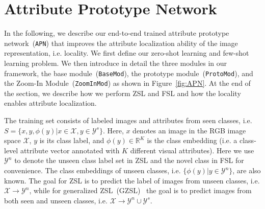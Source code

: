  

\section{Attribute Prototype Network}
In the following, we describe our end-to-end trained attribute prototype network~(\texttt{APN}) that improves the attribute localization ability of the image representation, i.e. locality. We first define our zero-shot learning and few-shot learning problem. We then introduce in detail the three modules in our framework, the base module~(\texttt{BaseMod}), the prototype module~(\texttt{ProtoMod}), and the Zoom-In Module~(\texttt{ZoomInMod}) as shown in Figure~\ref{fig:APN}. 
At the end of the section, we describe how we perform ZSL and FSL 
and how the locality enables attribute localization.

The training set consists of labeled images and attributes from seen classes, i.e. $S=\{x, y, \phi(y)| x \in \mathcal{X}, y \in \mathcal{Y}^s \}$.  Here, $x$ denotes an image in the RGB image space $\mathcal{X}$, $y$ is its class label, and $\phi(y) \in \mathbb{R}^{K}$ is the class embedding (i.e. a class-level attribute vector  
annotated with $K$ different visual attributes). 
Here we use $\mathcal{Y}^n$ to denote the unseen class label set in ZSL and the novel class in FSL for convenience. The class embeddings of unseen classes, i.e. $\{\phi(y)| y \in \mathcal{Y}^n \}$, are also known. 
The goal for ZSL is to predict the label of images from unseen classes, i.e. $\mathcal{X} \rightarrow \mathcal{Y}^n$, while for generalized ZSL~(GZSL)~\citep{xian2018zero} the goal is to predict images from both seen and unseen classes, i.e. $\mathcal{X} \rightarrow \mathcal{Y}^n \cup \mathcal{Y}^s$. 


